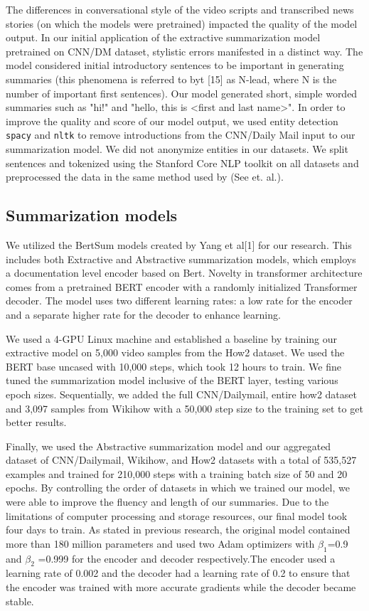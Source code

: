 \documentclass{article}
\begin{document}
The differences in conversational style of the video scripts and transcribed news stories (on which the models were pretrained) impacted the quality of the model output. In our initial application of the extractive summarization model pretrained on CNN/DM dataset, stylistic errors manifested in a distinct way. The model considered initial introductory sentences to be important in generating summaries (this phenomena is referred to byt [15] as N-lead, where N is the number of important first sentences). Our model generated short, simple worded summaries such as "hi!" and "hello, this is <first and last name>". In order to improve the quality and score of our model output, we used entity detection   \verb+spacy+ and \verb+nltk+ to remove introductions from the CNN/Daily Mail  input to our summarization model. We did not anonymize entities in our datasets. We split sentences and tokenized using the Stanford Core NLP toolkit on all datasets and preprocessed the data in the same method used by (See et. al.).  


\subsection{Summarization models}

We utilized the BertSum models created by Yang et al[1] for our research. This includes both Extractive and Abstractive summarization models, which employs a documentation level encoder based on Bert. Novelty in transformer architecture comes from a pretrained BERT encoder with a randomly initialized Transformer decoder. The model uses two different learning rates: a low rate for the encoder and a separate higher rate for the decoder to enhance learning.

We used a 4-GPU Linux machine and established a baseline by training  our extractive model on 5,000 video samples from the How2 dataset.  We used the BERT base uncased with 10,000 steps, which took 12 hours to train. We fine tuned the summarization model inclusive of the BERT layer, testing various epoch sizes. Sequentially, we added the full CNN/Dailymail, entire how2 dataset and 3,097 samples from Wikihow with a 50,000 step size to the training set to get better results.

Finally, we used the Abstractive summarization model and our aggregated dataset of CNN/Dailymail, Wikihow, and How2 datasets with a total of 535,527 examples and trained for 210,000 steps with a training batch size of 50 and 20 epochs. By controlling the order of datasets in which we trained our model, we were able to improve the fluency and length of our summaries. Due to the limitations of computer processing and storage resources, our final model took four days to train. As stated in previous research, the original model contained more than 180 million parameters and used two Adam optimizers with $\beta_1$=0.9 and $\beta_2$ =0.999 for the encoder and decoder respectively.The encoder used a learning rate of 0.002 and the decoder had a learning rate of 0.2 to ensure that the encoder was trained with more accurate gradients while the decoder became stable.
\end{document}

